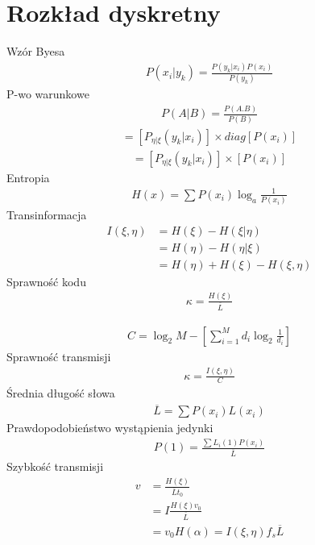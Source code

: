 \documentclass[10pt,twocolumn,a4paper,fleqn]{article}
\begin{document}
\author{Jakub Król}
\date{Semestr zimowy 2011}
\section{Rozkład dyskretny} 
Wzór Byesa
\begin{align*}
	P(x_i|y_k) = \frac{P(y_k|x_i) P(x_i)}{P(y_k)}
\end{align*}
P-wo warunkowe
\begin{align*}
	P(A|B) = \frac{P(A.B)}{P(B)}
\end{align*}
\begin{align*}
[P(y_k,x_i)] =	[P_{\eta|\xi}(y_k|x_i)]\times diag[P(x_i)]
\end{align*}
\begin{align*}
[P(y_k)] =	[P_{\eta|\xi}(y_k|x_i)]\times [P(x_i)]
\end{align*}
Entropia
\begin{align*}
	H(x) = \sum P(x_i) \log_a{\frac{1}{P(x_i)}}
\end{align*}
Transinformacja
\begin{align*}
	I(\xi,\eta) & = H(\xi)-H(\xi|\eta) \\
				& =H(\eta)-H(\eta|\xi)\\
				& = H(\eta)+H(\xi)-H(\xi,\eta)
\end{align*}
Sprawność kodu
\begin{align*}
	\kappa = \frac{H(\xi)}{\overline{L}}
\end{align*}

\begin{align*}
	C = \log_2{M} - \left[\sum_{i=1}^M d_i\log_2{\frac{1}{d_i}} \right]
\end{align*}
Sprawność transmisji
\begin{align*}
	\kappa = \frac{I(\xi,\eta)}{C}
\end{align*}
Średnia długość słowa
\begin{align*}
	\overline{L} = \sum P(x_i)L(x_i)
\end{align*}
Prawdopodobieństwo wystąpienia jedynki
\begin{align*}
	P(1) = \frac{\sum L_i(1)P(x_i)}{\overline{L}}
\end{align*}
Szybkość transmisji
\begin{align*}
	v 	& = \frac{H(\xi)}{\overline{L}t_0}\\
   		& = I\frac{H(\xi)v_0}{\overline{L}}\\
	 	& = v_0H(\alpha)=I(\xi,\eta)f_s \overline{L}
\end{align*}
\end{document}
